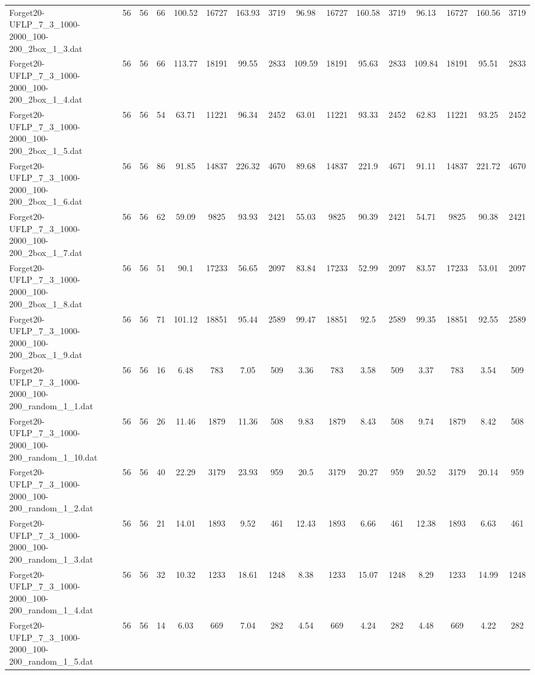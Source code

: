 \begin{sidewaystable}[!ht]
{\begin{tabular}{lccccccccccccccc}
Forget20-UFLP\_7\_3\_1000-2000\_100-200\_2box\_1\_3.dat & 56 & 56 & 66 & 100.52 & 16727 & 163.93 & 3719 & 96.98 & 16727 & 160.58 & 3719 & 96.13 & 16727 & 160.56 & 3719 \\
Forget20-UFLP\_7\_3\_1000-2000\_100-200\_2box\_1\_4.dat & 56 & 56 & 66 & 113.77 & 18191 & 99.55 & 2833 & 109.59 & 18191 & 95.63 & 2833 & 109.84 & 18191 &  \textcolor{blue2}{95.51} & 2833 \\
Forget20-UFLP\_7\_3\_1000-2000\_100-200\_2box\_1\_5.dat & 56 & 56 & 54 & 63.71 & 11221 & 96.34 & 2452 & 63.01 & 11221 & 93.33 & 2452 &  \textcolor{blue2}{62.83} & 11221 & 93.25 & 2452 \\
Forget20-UFLP\_7\_3\_1000-2000\_100-200\_2box\_1\_6.dat & 56 & 56 & 86 & 91.85 & 14837 & 226.32 & 4670 &  \textcolor{blue2}{89.68} & 14837 & 221.9 & 4671 & 91.11 & 14837 & 221.72 & 4670 \\
Forget20-UFLP\_7\_3\_1000-2000\_100-200\_2box\_1\_7.dat & 56 & 56 & 62 & 59.09 & 9825 & 93.93 & 2421 & 55.03 & 9825 & 90.39 & 2421 &  \textcolor{blue2}{54.71} & 9825 & 90.38 & 2421 \\
Forget20-UFLP\_7\_3\_1000-2000\_100-200\_2box\_1\_8.dat & 56 & 56 & 51 & 90.1 & 17233 & 56.65 & 2097 & 83.84 & 17233 & 52.99 & 2097 & 83.57 & 17233 & 53.01 & 2097 \\
Forget20-UFLP\_7\_3\_1000-2000\_100-200\_2box\_1\_9.dat & 56 & 56 & 71 & 101.12 & 18851 & 95.44 & 2589 & 99.47 & 18851 & 92.5 & 2589 & 99.35 & 18851 & 92.55 & 2589 \\
Forget20-UFLP\_7\_3\_1000-2000\_100-200\_random\_1\_1.dat & 56 & 56 & 16 & 6.48 & 783 & 7.05 & 509 &  \textcolor{blue2}{3.36} & 783 & 3.58 & 509 & 3.37 & 783 & 3.54 & 509 \\
Forget20-UFLP\_7\_3\_1000-2000\_100-200\_random\_1\_10.dat & 56 & 56 & 26 & 11.46 & 1879 & 11.36 & 508 & 9.83 & 1879 & 8.43 & 508 & 9.74 & 1879 & 8.42 & 508 \\
Forget20-UFLP\_7\_3\_1000-2000\_100-200\_random\_1\_2.dat & 56 & 56 & 40 & 22.29 & 3179 & 23.93 & 959 & 20.5 & 3179 & 20.27 & 959 & 20.52 & 3179 & 20.14 & 959 \\
Forget20-UFLP\_7\_3\_1000-2000\_100-200\_random\_1\_3.dat & 56 & 56 & 21 & 14.01 & 1893 & 9.52 & 461 & 12.43 & 1893 & 6.66 & 461 & 12.38 & 1893 & 6.63 & 461 \\
Forget20-UFLP\_7\_3\_1000-2000\_100-200\_random\_1\_4.dat & 56 & 56 & 32 & 10.32 & 1233 & 18.61 & 1248 & 8.38 & 1233 & 15.07 & 1248 & 8.29 & 1233 & 14.99 & 1248 \\
Forget20-UFLP\_7\_3\_1000-2000\_100-200\_random\_1\_5.dat & 56 & 56 & 14 & 6.03 & 669 & 7.04 & 282 & 4.54 & 669 & 4.24 & 282 & 4.48 & 669 & 4.22 & 282 \\

\end{tabular}}
\end{sidewaystable}
